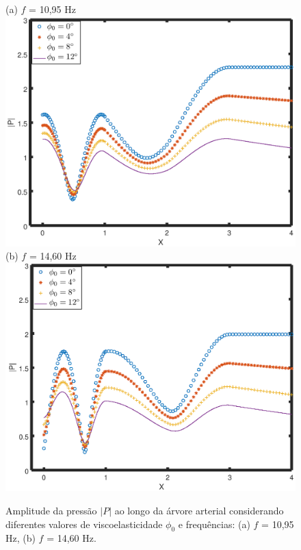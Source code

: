 \documentclass[
        english,			
        brazil			        %
        ,<...>]{abntbibufjf}
\begin{document}
\begin{figure}[!htbp]
	\centering
	(a) $f$ = 10,95 Hz\\
	\includegraphics[scale=0.7]{figure4-result/Figure4_f_10_95_new.png}\\
	(b) $f$ = 14,60 Hz\\
	\includegraphics[scale=0.7]{figure4-result/Figure4_f_14_60_new.png}\\
	\caption{Amplitude da pressão $|P|$ ao longo da árvore arterial considerando diferentes valores de viscoelasticidade $\phi_0$ e frequências: (a) $f$ = 10,95 Hz, (b) $f$ = 14,60 Hz.}
	\label{fig4b:arterial-tree}%
\end{figure}
\end{document}
